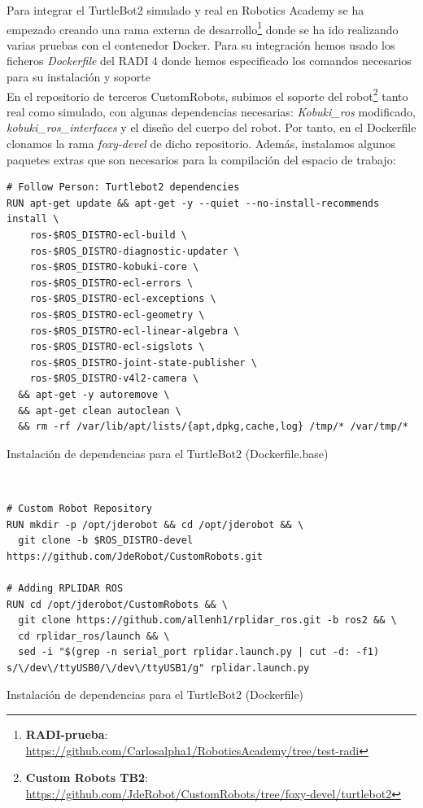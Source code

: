 Para integrar el TurtleBot2 simulado y real en Robotics Academy se ha empezado creando una rama externa de desarrollo\footnote{\textbf{RADI-prueba}: \url{https://github.com/Carlosalpha1/RoboticsAcademy/tree/test-radi}} donde se ha ido realizando varias pruebas con el contenedor Docker. Para su integración hemos usado los ficheros \textit{Dockerfile} del RADI 4 donde hemos especificado los comandos necesarios para su instalación y soporte\\

En el repositorio de terceros CustomRobots, subimos el soporte del robot\footnote{\textbf{Custom Robots TB2}: \url{https://github.com/JdeRobot/CustomRobots/tree/foxy-devel/turtlebot2}} tanto real como simulado, con algunas dependencias necesarias: \textit{Kobuki\_ros} modificado, \textit{kobuki\_ros\_interfaces} y el diseño del cuerpo del robot. Por tanto, en el Dockerfile clonamos la rama \textit{foxy-devel} de dicho repositorio. Además, instalamos algunos paquetes extras que son necesarios para la compilación del espacio de trabajo:

\begin{code}[H]
\begin{lstlisting}
# Follow Person: Turtlebot2 dependencies
RUN apt-get update && apt-get -y --quiet --no-install-recommends install \
    ros-$ROS_DISTRO-ecl-build \
    ros-$ROS_DISTRO-diagnostic-updater \
    ros-$ROS_DISTRO-kobuki-core \
    ros-$ROS_DISTRO-ecl-errors \
    ros-$ROS_DISTRO-ecl-exceptions \
    ros-$ROS_DISTRO-ecl-geometry \
    ros-$ROS_DISTRO-ecl-linear-algebra \
    ros-$ROS_DISTRO-ecl-sigslots \
    ros-$ROS_DISTRO-joint-state-publisher \
    ros-$ROS_DISTRO-v4l2-camera \
  && apt-get -y autoremove \
  && apt-get clean autoclean \
  && rm -rf /var/lib/apt/lists/{apt,dpkg,cache,log} /tmp/* /var/tmp/*
\end{lstlisting}
\caption{Instalación de dependencias para el TurtleBot2 (Dockerfile.base)}
\label{fig:instalacion_dependencias_turtlebot2_dockerfile_base}
\end{code}\

\begin{code}[H]
\begin{lstlisting}
# Custom Robot Repository
RUN mkdir -p /opt/jderobot && cd /opt/jderobot && \
  git clone -b $ROS_DISTRO-devel https://github.com/JdeRobot/CustomRobots.git

# Adding RPLIDAR ROS
RUN cd /opt/jderobot/CustomRobots && \
  git clone https://github.com/allenh1/rplidar_ros.git -b ros2 && \
  cd rplidar_ros/launch && \
  sed -i "$(grep -n serial_port rplidar.launch.py | cut -d: -f1) s/\/dev\/ttyUSB0/\/dev\/ttyUSB1/g" rplidar.launch.py
\end{lstlisting}
\caption{Instalación de dependencias para el TurtleBot2 (Dockerfile)}
\label{fig:instalacion_dependencias_turtlebot2_dockerfile}
\end{code}

